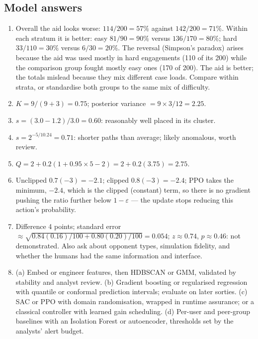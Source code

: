 \documentclass[11pt]{article}
\begin{document}
\subsection*{Model answers}
\begin{enumerate}
\item Overall the aid looks worse: $114/200=57\%$ against $142/200=71\%$. Within each stratum it is better: easy $81/90=90\%$ versus $136/170=80\%$; hard $33/110=30\%$ versus $6/30=20\%$. The reversal (Simpson's paradox) arises because the aid was used mostly in hard engagements (110 of its 200) while the comparison group fought mostly easy ones (170 of 200). The aid is better; the totals mislead because they mix different case loads. Compare within strata, or standardise both groups to the same mix of difficulty.
\item $K=9/(9+3)=0.75$; posterior variance $=9\times3/12=2.25$.
\item $s=(3.0-1.2)/3.0=0.60$: reasonably well placed in its cluster.
\item $s=2^{-5/10.24}=0.71$: shorter paths than average; likely anomalous, worth review.
\item $Q=2+0.2(1+0.95\times5-2)=2+0.2(3.75)=2.75$.
\item Unclipped $0.7(-3)=-2.1$; clipped $0.8(-3)=-2.4$; PPO takes the minimum, $-2.4$, which is the clipped (constant) term, so there is no gradient pushing the ratio further below $1-\varepsilon$ --- the update stops reducing this action's probability.
\item Difference 4 points; standard error $\approx\sqrt{0.84(0.16)/100+0.80(0.20)/100}=0.054$; $z\approx0.74$, $p\approx0.46$: not demonstrated. Also ask about opponent types, simulation fidelity, and whether the humans had the same information and interface.
\item (a) Embed or engineer features, then HDBSCAN or GMM, validated by stability and analyst review. (b) Gradient boosting or regularised regression with quantile or conformal prediction intervals; evaluate on later sorties. (c) SAC or PPO with domain randomisation, wrapped in runtime assurance; or a classical controller with learned gain scheduling. (d) Per-user and peer-group baselines with an Isolation Forest or autoencoder, thresholds set by the analysts' alert budget.
\end{enumerate}
\end{document}
